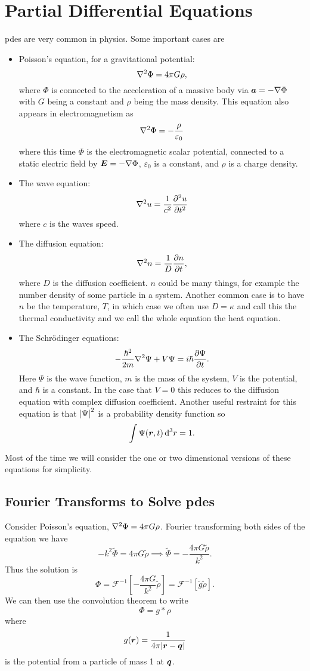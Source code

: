 \documentclass[a4paper]{article}
\newcommand{\FT}{\mathcal{F}}
\newcommand{\convolution}{\mathbin{*}}
\begin{document}
    \section{Partial Differential Equations}
    \Glspl{pde} are very common in physics.
    Some important cases are
    \begin{itemize}
        \item Poisson's equation, for a gravitational potential:
        \[\nabla^2\Phi = 4\pi G\rho,\]
        where \(\Phi\) is connected to the acceleration of a massive body via \(\bm{a} = -\nabla\Phi\) with \(G\) being a constant and \(\rho\) being the mass density.
        This equation also appears in electromagnetism as
        \[\nabla^2\Phi = -\frac{\rho}{\varepsilon_0}\]
        where this time \(\Phi\) is the electromagnetic scalar potential, connected to a static electric field by \(\bm{E} = -\nabla\Phi\), \(\varepsilon_0\) is a constant, and \(\rho\) is a charge density.
        
        \item The wave equation:
        \[\nabla^2 u = \frac{1}{c^2}\pdv[2]{u}{t}\]
        where \(c\) is the waves speed.
        
        \item The diffusion equation:
        \[\nabla^2 n = \frac{1}{D}\pdv{n}{t},\]
        where \(D\) is the diffusion coefficient.
        \(n\) could be many things, for example the number density of some particle in a system.
        Another common case is to have \(n\) be the temperature, \(T\), in which case we often use \(D = \kappa\) and call this the thermal conductivity and we call the whole equation the heat equation.
        
        \item The Schr\"odinger equations:
        \[-\frac{\hbar^2}{2m}\nabla^2\Psi + V\Psi = i\hbar\pdv{\Psi}{t}.\]
        Here \(\Psi\) is the wave function, \(m\) is the mass of the system, \(V\) is the potential, and \(\hbar\) is a constant.
        In the case that \(V = 0\) this reduces to the diffusion equation with complex diffusion coefficient.
        Another useful restraint for this equation is that \(\abs{\Psi}^2\) is a probability density function so
        \[\int \Psi(\bm{r}, t)\dd[3]{r} = 1.\]
    \end{itemize}
    Most of the time we will consider the one or two dimensional versions of these equations for simplicity.
    
    \subsection{Fourier Transforms to Solve \glspl{pde}}
    Consider Poisson's equation, \(\nabla^2\Phi = 4\pi G\rho\).
    Fourier transforming both sides of the equation we have
    \[-k^2\tilde{\Phi} = 4\pi G\tilde{\rho} \implies \tilde{\Phi} = -\frac{4\pi G\tilde{\rho}}{k^2}.\]
    Thus the solution is
    \[\Phi = \FT^{-1}\left[-\frac{4\pi G}{k^2}\tilde{\rho}\right] = \FT^{-1}[\tilde{g}\tilde{\rho}].\]
    We can then use the convolution theorem to write
    \[\Phi = g\convolution\rho\]
    where
    \[g(\bm{r}) = \frac{1}{4\pi\abs{\bm{r} - \bm{q}}}\]
    is the potential from a particle of mass 1 at \(\bm{q}\).
    
\end{document}
